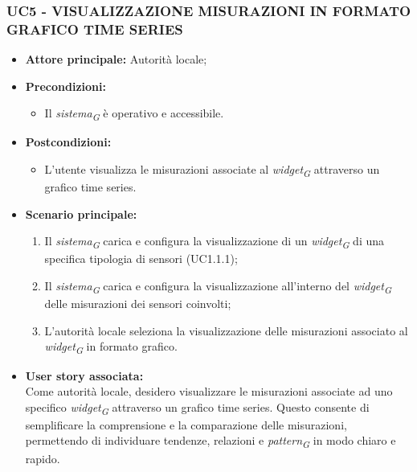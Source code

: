 \subsubsection{UC5 - VISUALIZZAZIONE MISURAZIONI IN FORMATO GRAFICO \newline TIME SERIES}
\begin{itemize}
    \item \textbf{Attore principale:} Autorità locale;
    \item \textbf{Precondizioni:}
        \begin{itemize}
            \item Il \textit{sistema}\textsubscript{\textit{G}} è operativo e accessibile.
        \end{itemize}
    \item \textbf{Postcondizioni:}
        \begin{itemize}
            \item L'utente visualizza le misurazioni associate al \textit{widget}\textsubscript{\textit{G}} attraverso un grafico time series.
        \end{itemize}
    \vspace{1cm}
    \item \textbf{Scenario principale:}
        \begin{enumerate}
            \item Il \textit{sistema}\textsubscript{\textit{G}} carica e configura la visualizzazione di un \textit{widget}\textsubscript{\textit{G}} di una specifica tipologia di sensori (UC1.1.1);
                \item Il \textit{sistema}\textsubscript{\textit{G}} carica e configura la visualizzazione all'interno del \textit{widget}\textsubscript{\textit{G}} delle misurazioni dei sensori coinvolti;
                \item L'autorità locale seleziona la visualizzazione delle misurazioni associato al \textit{widget}\textsubscript{\textit{G}} in formato grafico.
        \end{enumerate}
    \item \textbf{User story associata:} \\
        Come autorità locale, desidero visualizzare le misurazioni associate ad uno specifico \textit{widget}\textsubscript{\textit{G}} attraverso un grafico time series. Questo consente di semplificare la comprensione e la comparazione delle misurazioni, permettendo di individuare tendenze, relazioni e \textit{pattern}\textsubscript{\textit{G}} in modo chiaro e rapido.
\end{itemize}